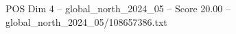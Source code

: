 \begin{textsample}{POS Dim 4 – global\_north\_2024\_05 – Score 20.00 – global\_north\_2024\_05/108657386.txt}
\end{textsample}
